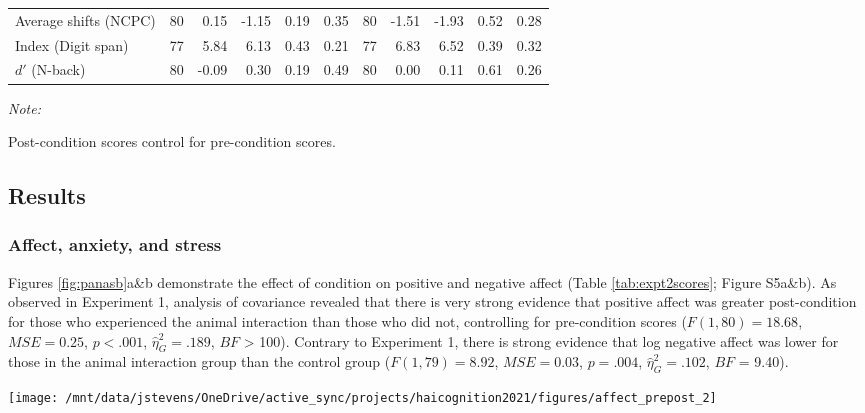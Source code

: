 \documentclass[
  english,
  pub,floatsintext]{apa6}
\begin{document}
\begin{table*}
{\begin{threeparttable}
\begin{tabular}[t]{lrrrrrrrrrr}
\hspace{1em}Average shifts (NCPC) & 80 & 0.15 & -1.15 & 0.19 & 0.35 & 80 & -1.51 & -1.93 & 0.52 & 0.28\\
\hspace{1em}Index (Digit span) & 77 & 5.84 & 6.13 & 0.43 & 0.21 & 77 & 6.83 & 6.52 & 0.39 & 0.32\\
\hspace{1em}$d'$ (N-back) & 80 & -0.09 & 0.30 & 0.19 & 0.49 & 80 & 0.00 & 0.11 & 0.61 & 0.26\\
\bottomrule
\end{tabular}
\begin{tablenotes}
\item \textit{Note: } 
\item Post-condition scores control for pre-condition scores.
\end{tablenotes}
\end{threeparttable}}
\end{table*}

\hypertarget{results-1}{%
\subsection{Results}\label{results-1}}

\hypertarget{affect-anxiety-and-stress}{%
\subsubsection{Affect, anxiety, and stress}\label{affect-anxiety-and-stress}}

Figures \ref{fig:panasb}a\&b demonstrate the effect of condition on positive and negative affect (Table \ref{tab:expt2scores}; Figure S5a\&b). As observed in Experiment 1, analysis of covariance revealed that there is very strong evidence that positive affect was greater post-condition for those who experienced the animal interaction than those who did not, controlling for pre-condition scores (\(F(1, 80) = 18.68\), \(\mathit{MSE} = 0.25\), \(p < .001\), \(\hat{\eta}^2_G = .189\), \(BF\) \textgreater{} 100). Contrary to Experiment 1, there is strong evidence that log negative affect was lower for those in the animal interaction group than the control group (\(F(1, 79) = 8.92\), \(\mathit{MSE} = 0.03\), \(p = .004\), \(\hat{\eta}^2_G = .102\), \(BF\) = 9.40).



\begin{figure*}
\texttt{[image: /mnt/data/jstevens/OneDrive/active\_sync/projects/haicognition2021/figures/affect\_prepost\_2]} \caption{Affect scores pre- and post-condition for control and HAI (human-animal interaction) groups in Experiment 2. Scores show (a) positive PANAS ratings, (b) negative PANAS ratings, (c) anxiety ratings, and (d) stress ratings. Open triangles (blue) represent individual control participant scores, open circles (orange) represent individual HAI participant scores, closed triangles and circles represent condition group means (with lines connecting condition means), error bars represent 95\% confidence intervals.}\label{fig:panasb}
\end{figure*}
\end{document}
